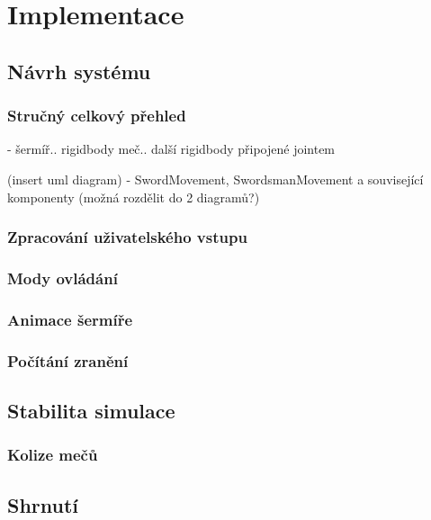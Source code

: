 \chapter{Implementace}

\section{Návrh systému}

\subsection{Stručný celkový přehled}

- šermíř.. rigidbody
  meč.. další rigidbody připojené jointem

(insert uml diagram)
- SwordMovement, SwordsmanMovement a související komponenty (možná rozdělit do 2 diagramů?)


\subsection{Zpracování uživatelského vstupu}

\subsection{Mody ovládání}

\subsection{Animace šermíře}

\subsection{Počítání zranění}


\section{Stabilita simulace}

\subsection{Kolize mečů}



\section{Shrnutí}
